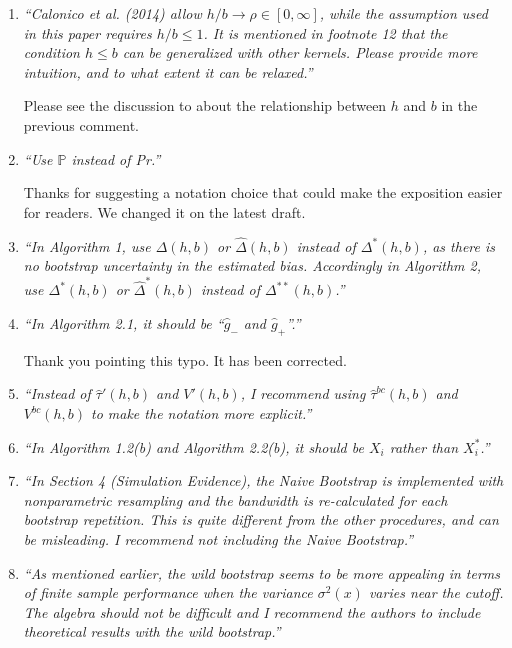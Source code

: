 \documentclass[12pt,fleqn]{article}
\begin{document}
\begin{enumerate}
\item \textit{``Calonico et al. (2014) allow $h/b \rightarrow \rho \in [0,\infty]$, while the assumption used in this paper requires $h/b \leq 1$. It is mentioned in footnote 12 that the condition $h \leq b$ can be generalized with other kernels. Please provide more intuition, and to what extent it can be relaxed.''}

Please see the discussion to about the relationship between $h$ and $b$ in the previous comment.

\item \textit{``Use $\mathbb{P}$ instead of Pr.''}

Thanks for suggesting a notation choice that could make the exposition easier for readers. We changed it on the latest draft.

\item \textit{``In Algorithm 1, use $\Delta(h,b)$ or $\hat{\Delta}(h,b)$ instead of $\Delta^{*}(h,b)$, as there is no bootstrap uncertainty in the estimated bias. Accordingly in Algorithm 2, use $\Delta^{*}(h,b)$ or $\hat{\Delta}^{*}(h,b)$ instead of $\Delta^{**}(h,b)$.''}


\item \textit{``In Algorithm 2.1, it should be ``$\hat{g}_{-}$ and $\hat{g}_{+}$''.''}
 
 Thank you pointing this typo. It has been corrected.

\item \textit{``Instead of $\hat{\tau}'(h,b)$ and $V'(h,b)$, I recommend using $\hat{\tau}^{bc}(h,b)$ and $V^{bc}(h,b)$ to make the notation more explicit.''}


\item \textit{``In Algorithm 1.2(b) and Algorithm 2.2(b), it should be $X_{i}$ rather than $X^{*}_{i}$.''}
 

\item \textit{``In Section 4 (Simulation Evidence), the Naive Bootstrap is implemented with nonparametric resampling and the bandwidth is re-calculated for each bootstrap repetition.
This is quite different from the other procedures, and can be misleading. I recommend not including the Naive Bootstrap.''}

\item \textit{``As mentioned earlier, the wild bootstrap seems to be more appealing in terms of finite sample performance when the variance $\sigma^{2}(x)$ varies near the cutoff. The algebra should not be difficult and I recommend the authors to include theoretical results with the wild bootstrap.''}


\end{enumerate}
\end{document}

